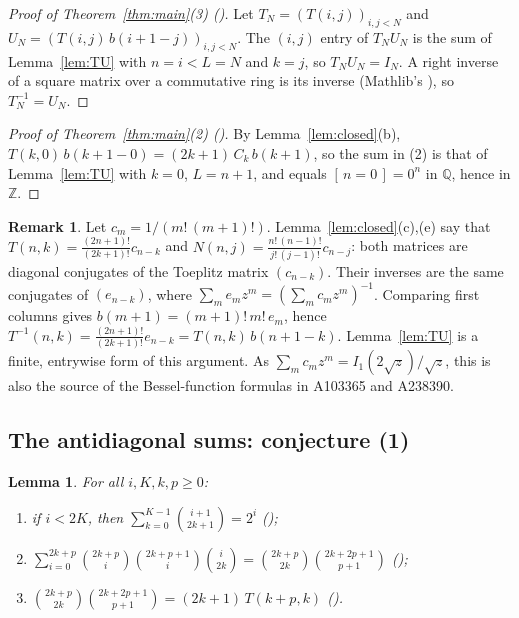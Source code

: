 \documentclass[11pt]{amsart}
\theoremstyle{plain}
\newtheorem{lemma}[theorem]{Lemma}
\theoremstyle{definition}
\newtheorem{remark}[theorem]{Remark}
\newcommand{\Z}{\mathbb{Z}}
\newcommand{\Q}{\mathbb{Q}}
\newcommand{\ib}[1]{[\,#1\,]}
\begin{document}
\begin{proof}[Proof of Theorem~\ref{thm:main}(3) \textup{()}]
Let $T_N=(T(i,j))_{i,j<N}$ and $U_N=(T(i,j)\,b(i+1-j))_{i,j<N}$. The $(i,j)$ entry of $T_NU_N$ is the sum of Lemma~\ref{lem:TU} with $n=i<L=N$ and $k=j$, so $T_NU_N=I_N$. A right inverse of a square matrix over a commutative ring is its inverse (Mathlib's ), so $T_N^{-1}=U_N$.
\end{proof}

\begin{proof}[Proof of Theorem~\ref{thm:main}(2) \textup{()}]
By Lemma~\ref{lem:closed}(b), $T(k,0)\,b(k+1-0)=(2k+1)\,C_k\,b(k+1)$, so the sum in (2) is that of Lemma~\ref{lem:TU} with $k=0$, $L=n+1$, and equals $\ib{n=0}=0^n$ in $\Q$, hence in $\Z$.
\end{proof}

\begin{remark}\label{rem:toeplitz}
Let $c_m=1/(m!\,(m+1)!)$. Lemma~\ref{lem:closed}(c),(e) say that $T(n,k)=\frac{(2n+1)!}{(2k+1)!}c_{n-k}$ and $N(n,j)=\frac{n!\,(n-1)!}{j!\,(j-1)!}c_{n-j}$: both matrices are diagonal conjugates of the Toeplitz matrix $(c_{n-k})$. Their inverses are the same conjugates of $(e_{n-k})$, where $\sum_me_mz^m=(\sum_mc_mz^m)^{-1}$. Comparing first columns gives $b(m+1)=(m+1)!\,m!\,e_m$, hence $T^{-1}(n,k)=\frac{(2n+1)!}{(2k+1)!}e_{n-k}=T(n,k)\,b(n+1-k)$. Lemma~\ref{lem:TU} is a finite, entrywise form of this argument. As $\sum_mc_mz^m=I_1(2\sqrt z)/\sqrt z$, this is also the source of the Bessel-function formulas in A103365 and A238390.
\end{remark}

\subsection{The antidiagonal sums: conjecture (1)}

\begin{lemma}\label{lem:binom}
For all $i,K,k,p\ge0$:
\begin{enumerate}
\item[(a)] if $i<2K$, then $\sum_{k=0}^{K-1}\binom{i+1}{2k+1}=2^i$ \quad();
\item[(b)] $\sum_{i=0}^{2k+p}\binom{2k+p}{i}\binom{2k+p+1}{i}\binom{i}{2k}=\binom{2k+p}{2k}\binom{2k+2p+1}{p+1}$ \quad();
\item[(c)] $\binom{2k+p}{2k}\binom{2k+2p+1}{p+1}=(2k+1)\,T(k+p,k)$ \quad().
\end{enumerate}
\end{lemma}
\end{document}
